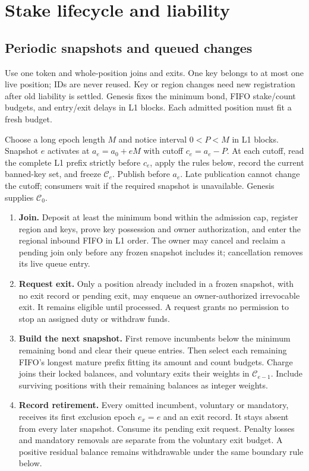 \documentclass[11pt,a4paper]{article}
\newcommand{\cfg}{\mathcal C}
\begin{document}
\newpage
\section{Stake lifecycle and liability}
\label{sec:stake}
\subsection{Periodic snapshots and queued changes}
Use one token and whole-position joins and exits. One key belongs to at
most one live position; IDs are never reused. Key or region changes need
new registration after old liability is settled. Genesis fixes the
minimum bond, FIFO stake/count budgets, and entry/exit delays in L1 blocks.
Each admitted position must fit a fresh budget.

Choose a long epoch length $M$ and notice interval $0<P<M$ in L1 blocks.
Snapshot $e$ activates at $a_e=a_0+eM$ with cutoff $c_e=a_e-P$.
At each cutoff, read the complete L1 prefix strictly before $c_e$, apply
the rules below, record the current banned-key set, and freeze $\cfg_e$.
Publish before $a_e$. Late publication cannot change the cutoff; consumers
wait if the required snapshot is unavailable. Genesis supplies $\cfg_0$.

\begin{enumerate}[label=\textbf{\arabic*.},itemsep=3pt]
\item \textbf{Join.} Deposit at least the minimum bond within the admission
cap, register region and keys, prove key possession and owner authorization,
and enter the regional inbound FIFO in L1 order.
The owner may cancel and reclaim a pending join only before any frozen
snapshot includes it; cancellation removes its live queue entry.
\item \textbf{Request exit.} Only a position already included in a frozen
snapshot, with no exit record or pending exit, may enqueue an owner-authorized
irrevocable exit. It remains eligible until processed. A request grants no
permission to stop an assigned duty or withdraw funds.
\item \textbf{Build the next snapshot.} First remove incumbents below
the minimum remaining bond and clear their queue entries. Then select
each remaining FIFO's longest mature prefix
fitting its amount and count budgets. Charge joins their locked balances,
and voluntary exits their weights in $\cfg_{e-1}$. Include surviving
positions with their remaining balances as integer weights.
\item \textbf{Record retirement.} Every omitted incumbent, voluntary or
mandatory, receives its first exclusion epoch $e_x=e$ and an exit record.
It stays absent from every later snapshot. Consume its pending exit
request. Penalty losses and mandatory removals are separate from the
voluntary exit budget. A positive residual balance remains withdrawable
under the same boundary rule below.
\end{enumerate}
\end{document}
